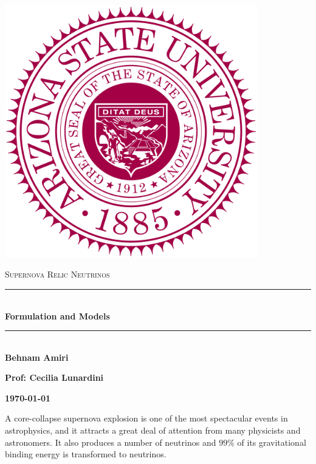 \documentclass[fleqn]{article}
\begin{document}
  \begin{titlepage}

    \newcommand{\HRule}{\rule{\linewidth}{0.5mm}}

    \center

    \begin{center}
      \includegraphics[height=11cm, width=11cm]{asu.png}
    \end{center}

    \vline

    \textsc{\LARGE Supernova Relic Neutrinos}\\[1.5cm]

    \HRule \\[0.5cm]
    { \huge \bfseries Formulation and Models}\\[0.4cm] 
    \HRule \\[1.0cm]

    \textbf{Behnam Amiri}

    \bigbreak

    \textbf{Prof: Cecilia Lunardini}

    \bigbreak

    \textbf{{\large \today}\\[2cm]}

    \vfill

  \end{titlepage}

  A core-collapse supernova explosion is one of the most spectacular events in astrophysics,
  and it attracts a great deal of attention from many physicists and astronomers. It
  also produces a number of neutrinos and $99\%$ of its gravitational binding energy is
  transformed to neutrinos.
\end{document}
